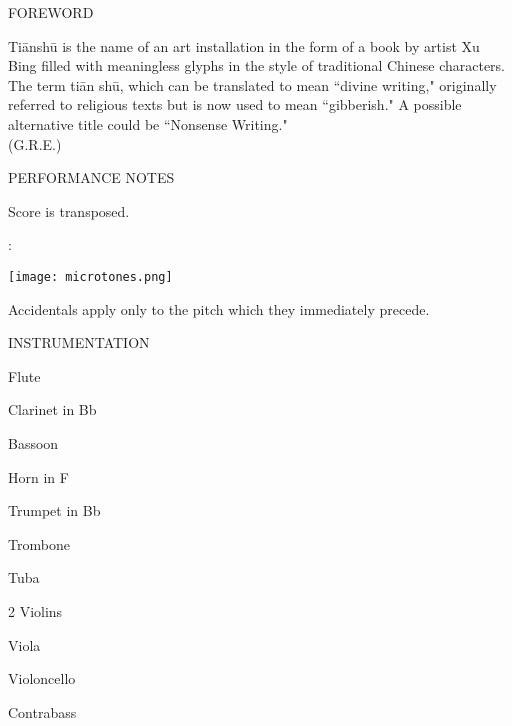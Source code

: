\documentclass[10pt]{article}
\begin{document}
\begin{center}
\huge FOREWORD
\end{center}

\begin{center}
Ti\=ansh\=u is the name of an art installation in the form of a book by artist Xu Bing filled with meaningless glyphs in the style of traditional Chinese characters. The term ti\=an sh\=u, which can be translated to mean ``divine writing," originally referred to religious texts but is now used to mean ``gibberish." A possible alternative title could be ``Nonsense Writing."\\
\phantom{text} \hfill (G.R.E.)
  \end{center}
  
\vspace*{1\baselineskip}

\begin{center}
\huge PERFORMANCE NOTES
\end{center}

\begin{center}
Score is transposed.
\end{center}

\begin{center}
:
\end{center}

\begin{center}
\texttt{[image: microtones.png]}
\end{center}

\begin{center}
Accidentals apply only to the pitch which they immediately precede.
\end{center}

\vspace*{0.3\baselineskip}

\begin{center}
\huge INSTRUMENTATION
\end{center}
\begin{center}
Flute
\end{center}
\begin{center}
Clarinet in Bb
\end{center}
\begin{center}
Bassoon
\end{center}
\begin{center}
Horn in F
\end{center}
\begin{center}
Trumpet in Bb
\end{center}
\begin{center}
Trombone
\end{center}
\begin{center}
Tuba
\end{center}
\begin{center}
2 Violins
\end{center}
\begin{center}
Viola
\end{center}
\begin{center}
Violoncello
\end{center}
\begin{center}
Contrabass
\end{center}
\end{document}
